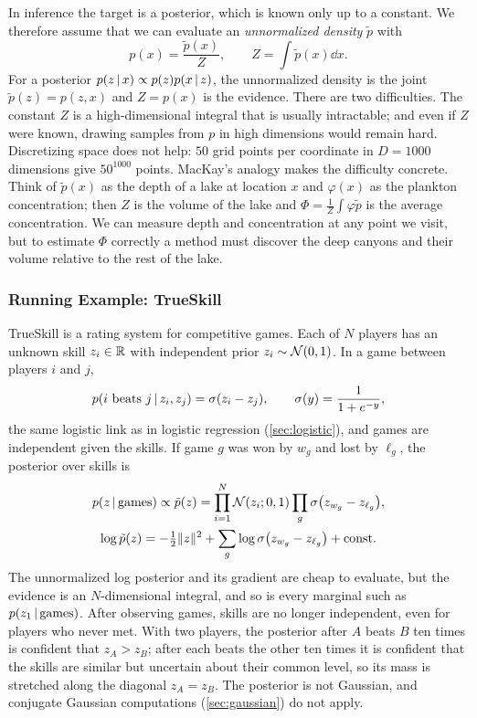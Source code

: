 In inference the target is a posterior, which is known only up to a constant. We therefore assume that we can evaluate an \emph{unnormalized density} $\tilde p$ with
\[
p(x)=\frac{\tilde p(x)}{Z},\qquad Z=\int\tilde p(x)\dd x.
\]
For a posterior $p(z\,|\, x)\propto p(z)p(x\,|\, z)$, the unnormalized density is the joint $\tilde p(z)=p(z,x)$ and $Z=p(x)$ is the evidence. There are two difficulties. The constant $Z$ is a high-dimensional integral that is usually intractable; and even if $Z$ were known, drawing samples from $p$ in high dimensions would remain hard. Discretizing space does not help: $50$ grid points per coordinate in $D=1000$ dimensions give $50^{1000}$ points. MacKay's analogy makes the difficulty concrete. Think of $\tilde p(x)$ as the depth of a lake at location $x$ and $\varphi(x)$ as the plankton concentration; then $Z$ is the volume of the lake and $\Phi=\frac1Z\int\varphi\tilde p$ is the average concentration. We can measure depth and concentration at any point we visit, but to estimate $\Phi$ correctly a method must discover the deep canyons and their volume relative to the rest of the lake.

\subsubsection{Running Example: TrueSkill}

TrueSkill is a rating system for competitive games. Each of $N$ players has an unknown skill $z_i\in\mathbb{R}$ with independent prior $z_i\sim\mathcal{N}(0,1)$. In a game between players $i$ and $j$,
\[
p(i\text{ beats }j\,|\, z_i,z_j)=\sigma(z_i-z_j),\qquad\sigma(y)=\frac1{1+e^{-y}},
\]
the same logistic link as in logistic regression (\cref{sec:logistic}), and games are independent given the skills. If game $g$ was won by $w_g$ and lost by $\ell_g$, the posterior over skills is
\begin{gather*}
p(z\,|\,\text{games})\propto\tilde p(z)=\prod_{i=1}^N\mathcal{N}(z_i;0,1)\prod_{g}\sigma\big(z_{w_g}-z_{\ell_g}\big),\\
\log\tilde p(z)=-\tfrac12\lVert z\rVert^2+\sum_g\log\sigma\big(z_{w_g}-z_{\ell_g}\big)+\text{const}.
\end{gather*}
The unnormalized log posterior and its gradient are cheap to evaluate, but the evidence is an $N$-dimensional integral, and so is every marginal such as $p(z_1\,|\,\text{games})$. After observing games, skills are no longer independent, even for players who never met. With two players, the posterior after $A$ beats $B$ ten times is confident that $z_A>z_B$; after each beats the other ten times it is confident that the skills are similar but uncertain about their common level, so its mass is stretched along the diagonal $z_A=z_B$. The posterior is not Gaussian, and conjugate Gaussian computations (\cref{sec:gaussian}) do not apply.

